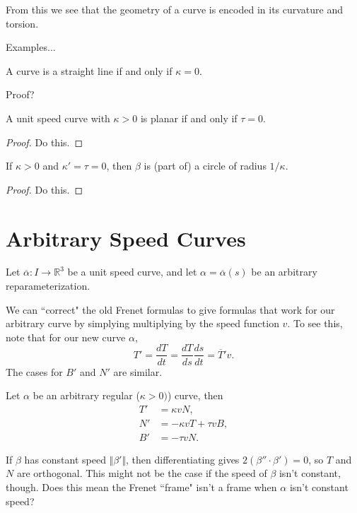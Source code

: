 \documentclass[10pt]{report}
\begin{document}
From this we see that the geometry of a curve is encoded in its curvature and torsion.

{\color{red}Examples...}

\begin{prop}
A curve is a straight line if and only if $\kappa=0$.
\end{prop}
{\color{red}Proof?}

\begin{prop}
 	A unit speed curve with $\kappa>0$ is planar if and only if $\tau = 0$.
\end{prop}
\begin{proof}
	{\color{red}Do this.}
\end{proof}

\begin{lem}
	If $\kappa>0$ and $\kappa'=\tau=0$, then $\beta$ is (part of) a circle of radius $1/\kappa$.
\end{lem}
\begin{proof}
	{\color{red}Do this.}
\end{proof}


\section{Arbitrary Speed Curves}

Let $\overline{\alpha} :I\to \mathbb{R}^3$ be a unit speed curve, and let $\alpha=\overline{\alpha}(s)$ be an arbitrary reparameterization. 

We can ``correct" the old Frenet formulas to give formulas that work for our arbitrary curve by simplying multiplying by the speed function $v$. To see this, note that for our new curve $\alpha$,
\[
T' = \frac{d T}{d t} = \frac{d T}{d s} \frac{d s}{d t} = \overline{T}'v.
\] 
The cases for $B'$ and $N'$ are similar.

\begin{thrm}[]
	Let $\alpha$ be an arbitrary regular ($\kappa>0)$) curve, then
\begin{align*}
	T' &= \kappa v N, \\
	N' &= -\kappa v T + \tau v B, \\
	B' &= -\tau v N.
\end{align*}
\end{thrm}

If $\beta$ has constant speed $\Vert{\beta'}\Vert$, then differentiating gives $2(\beta''\cdot \beta') = 0$, so $T$ and $N$ are orthogonal. This might not be the case if the speed of $\beta$ isn't constant, though. {\color{red}Does this mean the Frenet ``frame" isn't a frame when $\alpha$ isn't constant speed?}
\end{document}
